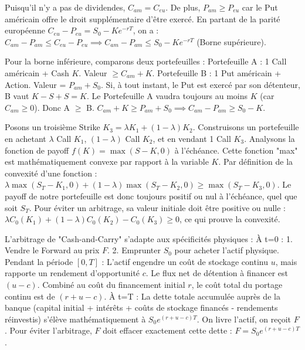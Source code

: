 \begin{correctionbox}
Puisqu'il n'y a pas de dividendes, $C_{am} = C_{eu}$.
De plus, $P_{am} \ge P_{eu}$ car le Put américain offre le droit supplémentaire d'être exercé.
En partant de la parité européenne $C_{eu} - P_{eu} = S_0 - K e^{-rT}$, on a :
$C_{am} - P_{am} \le C_{eu} - P_{eu} \implies C_{am} - P_{am} \le S_0 - K e^{-rT}$ (Borne supérieure).

Pour la borne inférieure, comparons deux portefeuilles :
Portefeuille A : 1 Call américain + Cash $K$. Valeur $\ge C_{am} + K$.
Portefeuille B : 1 Put américain + Action. Valeur = $P_{am} + S_0$.
Si, à tout instant, le Put est exercé par son détenteur, B vaut $K - S + S = K$. Le Portefeuille A vaudra toujours au moins $K$ (car $C_{am} \ge 0$). Donc A $\ge$ B.
$C_{am} + K \ge P_{am} + S_0 \implies C_{am} - P_{am} \ge S_0 - K$.
\end{correctionbox}

\newpage

\begin{correctionbox}
Posons un troisième Strike $K_3 = \lambda K_1 + (1-\lambda) K_2$.
Construisons un portefeuille en achetant $\lambda$ Call $K_1$, $(1-\lambda)$ Call $K_2$, et en vendant 1 Call $K_3$.
Analysons la fonction de payoff $f(K) = \max(S - K, 0)$ à l'échéance. Cette fonction "max" est mathématiquement convexe par rapport à la variable $K$.
Par définition de la convexité d'une fonction :
$\lambda \max(S_T - K_1, 0) + (1-\lambda) \max(S_T - K_2, 0) \ge \max(S_T - K_3, 0)$.
Le payoff de notre portefeuille est donc toujours positif ou nul à l'échéance, quel que soit $S_T$.
Pour éviter un arbitrage, sa valeur initiale doit être positive ou nulle :
$\lambda C_0(K_1) + (1-\lambda) C_0(K_2) - C_0(K_3) \ge 0$, ce qui prouve la convexité.
\end{correctionbox}

\begin{correctionbox}
L'arbitrage de "Cash-and-Carry" s'adapte aux spécificités physiques :
À t=0 :
1. Vendre le Forward au prix $F$.
2. Emprunter $S_0$ pour acheter l'actif physique.
Pendant la période $[0, T]$ :
L'actif engendre un coût de stockage continu $u$, mais rapporte un rendement d'opportunité $c$. Le flux net de détention à financer est $(u - c)$. Combiné au coût du financement initial $r$, le coût total du portage continu est de $(r + u - c)$.
À t=T :
La dette totale accumulée auprès de la banque (capital initial + intérêts + coûts de stockage financés - rendements réinvestis) s'élève mathématiquement à $S_0 e^{(r + u - c)T}$.
On livre l'actif, on reçoit $F$. Pour éviter l'arbitrage, $F$ doit effacer exactement cette dette :
$F = S_0 e^{(r + u - c)T}$.
\end{correctionbox}